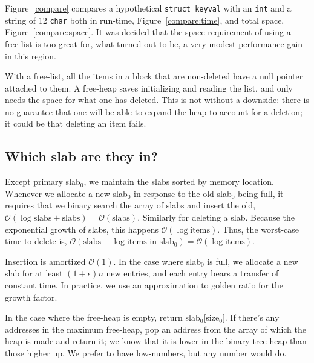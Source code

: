 \documentclass[12pt]{article}
\newcommand{\code}[1]{\colorbox{light-gray}{\texttt{#1}}}
\begin{document}
Figure~\ref{compare} compares a hypothetical \code{struct keyval} with an \code{int} and a string of 12 \code{char} both in run-time, Figure~\ref{compare:time}, and total space, Figure~\ref{compare:space}. It was decided that the space requirement of using a free-list is too great for, what turned out to be, a very modest performance gain in this region.

With a free-list, all the items in a block that are non-deleted have a null pointer attached to them. A free-heap saves initializing and reading the list, and only needs the space for what one has deleted. This is not without a downside: there is no guarantee that one will be able to expand the heap to account for a deletion; it could be that deleting an item fails.

\subsection{Which slab are they in?}

Except primary slab$_0$, we maintain the slabs sorted by memory location. Whenever we allocate a new slab$_0$ in response to the old slab$_0$ being full, it requires that we binary search the array of slabs and insert the old, $\mathcal{O}(\log \text{slabs} + \text{slabs}) = \mathcal{O}(\text{slabs})$. Similarly for deleting a slab. Because the exponential growth of slabs, this happens $\mathcal{O}(\log \text{items})$. Thus, the worst-case time to delete is, $\mathcal{O}(\text{slabs} + \log \text{items in slab$_0$}) = \mathcal{O}(\log \text{items})$.

Insertion is amortized $\mathcal{O}(1)$. In the case where slab$_0$ is full, we allocate a new slab for at least $(1+\epsilon)n$ new entries, and each entry bears a transfer of constant time. In practice, we use an approximation to golden ratio for the growth factor.

In the case where the free-heap is empty, return slab$_0[$size$_0]$. If there's any addresses in the maximum free-heap, pop an address from the array of which the heap is made and return it; we know that it is lower in the binary-tree heap than those higher up. We prefer to have low-numbers, but any number would do.
\end{document}

